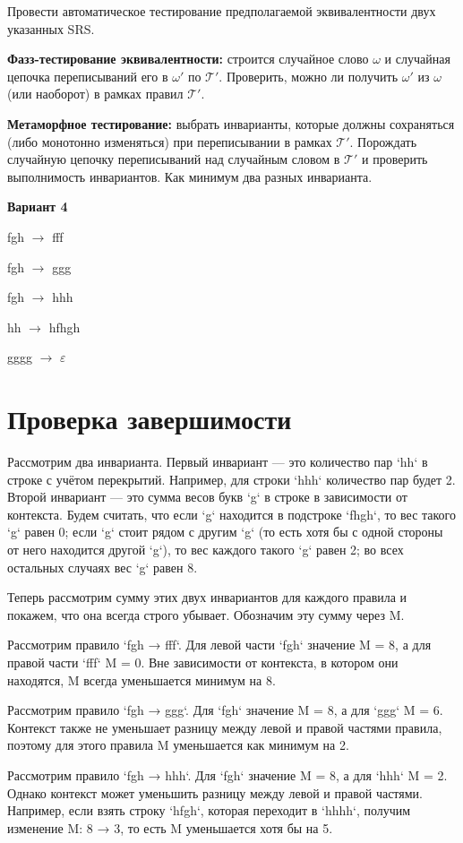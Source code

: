 \documentclass[a4paper, 14pt]{extarticle}
\begin{document}
Провести автоматическое тестирование предполагаемой эквивалентности двух указанных SRS.

\textbf{Фазз-тестирование эквивалентности:} строится случайное слово $\omega$ и случайная цепочка переписываний его в $\omega'$ по $\mathcal{T}'$. Проверить, можно ли получить $\omega'$ из $\omega$ (или наоборот) в рамках правил $\mathcal{T}'$.

\textbf{Метаморфное тестирование:} выбрать инварианты, которые должны сохраняться (либо монотонно изменяться) при переписывании в рамках $\mathcal{T}'$. Порождать случайную цепочку переписываний над случайным словом в $\mathcal{T}'$ и проверить выполнимость инвариантов. Как минимум два разных инварианта.

\textbf{Вариант 4}

fgh $\rightarrow$ fff

fgh $\rightarrow$ ggg

fgh $\rightarrow$ hhh

hh $\rightarrow$ hfhgh

gggg $\rightarrow$ $\varepsilon$


\section{Проверка завершимости}

Рассмотрим два инварианта. Первый инвариант — это количество пар `hh` в строке с учётом перекрытий. Например, для строки `hhh` количество пар будет 2. Второй инвариант — это сумма весов букв `g` в строке в зависимости от контекста. Будем считать, что если `g` находится в подстроке `fhgh`, то вес такого `g` равен 0; если `g` стоит рядом с другим `g` (то есть хотя бы с одной стороны от него находится другой `g`), то вес каждого такого `g` равен 2; во всех остальных случаях вес `g` равен 8. 

Теперь рассмотрим сумму этих двух инвариантов для каждого правила и покажем, что она всегда строго убывает. Обозначим эту сумму через M.

Рассмотрим правило `fgh → fff`. Для левой части `fgh` значение M = 8, а для правой части `fff` M = 0. Вне зависимости от контекста, в котором они находятся, M всегда уменьшается минимум на 8.

Рассмотрим правило `fgh → ggg`. Для `fgh` значение M = 8, а для `ggg` M = 6. Контекст также не уменьшает разницу между левой и правой частями правила, поэтому для этого правила M уменьшается как минимум на 2.

Рассмотрим правило `fgh → hhh`. Для `fgh` значение M = 8, а для `hhh` M = 2. Однако контекст может уменьшить разницу между левой и правой частями. Например, если взять строку `hfgh`, которая переходит в `hhhh`, получим изменение M: 8 → 3, то есть M уменьшается хотя бы на 5.
\end{document}
